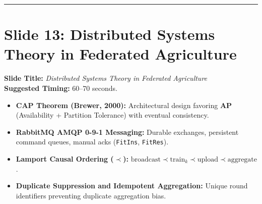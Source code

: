 \documentclass[11pt,a4paper]{article}
\begin{document}
\vspace{0.35cm}\hrule\vspace{0.35cm}

\section{Slide 13: Distributed Systems Theory in Federated Agriculture}
\textbf{Slide Title:} \textit{Distributed Systems Theory in Federated Agriculture} \\
\textbf{Suggested Timing:} 60--70 seconds.

\begin{tcolorbox}[colframe=primaryblue, title=\textbf{Key Distributed Systems Points to Emphasize}]
\begin{itemize}[leftmargin=*]
    \item \textbf{CAP Theorem (Brewer, 2000):} Architectural design favoring \textbf{AP} (Availability + Partition Tolerance) with eventual consistency.
    \item \textbf{RabbitMQ AMQP 0-9-1 Messaging:} Durable exchanges, persistent command queues, manual acks (\texttt{FitIns}, \texttt{FitRes}).
    \item \textbf{Lamport Causal Ordering ($\prec$):} $\text{broadcast} \prec \text{train}_k \prec \text{upload} \prec \text{aggregate}$.
    \item \textbf{Duplicate Suppression and Idempotent Aggregation:} Unique round identifiers preventing duplicate aggregation bias.
\end{itemize}
\end{tcolorbox}
\end{document}
